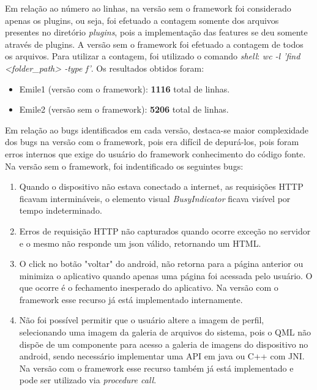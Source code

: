 Em relação ao número ao linhas, na versão sem o framework foi considerado apenas os plugins, ou seja, foi efetuado a contagem somente dos arquivos presentes no diretório \textit{plugins}, pois a implementação das features se deu somente através de plugins. A versão sem o framework foi efetuado a contagem de todos os arquivos. Para utilizar a contagem, foi utilizado o comando \textit{shell}: \textit{wc -l 'find <folder\_path> -type f'}. Os resultados obtidos foram:

\begin{itemize}
	\item Emile1 (versão com o framework): \textbf{1116} total de linhas.
	\item Emile2 (versão sem o framework): \textbf{5206} total de linhas.
\end{itemize}

Em relação ao bugs identificados em cada versão, destaca-se maior complexidade dos bugs na versão com o framework, pois era difícil de depurá-los, pois foram erros internos que exige do usuário do framework conhecimento do código fonte. Na versão sem o framework, foi indentificado os seguintes bugs:

\begin{enumerate}
	\item  Quando o dispositivo não estava conectado a internet, as requisições HTTP ficavam intermináveis, o elemento visual \textit{BusyIndicator} ficava visível por tempo indeterminado.

	\item Erros de requisição HTTP não capturados quando ocorre exceção no servidor e o mesmo não responde um json válido, retornando um HTML.

	\item O click no botão "voltar" do android, não retorna para a página anterior ou minimiza o aplicativo quando apenas uma página foi acessada pelo usuário. O que ocorre é o fechamento inesperado do aplicativo. Na versão com o framework esse recurso já está implementado internamente.

	\item Não foi possível permitir que o usuário altere a imagem de perfil, selecionando uma imagem da galeria de arquivos do sistema, pois o QML não dispõe de um componente para acesso a galeria de imagens do dispositivo no android, sendo necessário implementar uma API em java ou C++ com JNI. Na versão com o framework esse recurso também já está implementado e pode ser utilizado via \textit{procedure call}.
\end{enumerate}

